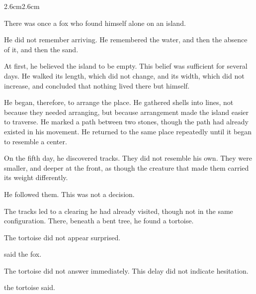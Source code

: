 \begin{adjustwidth}{2.6cm}{2.6cm}

There was once a fox who found himself alone on an island.

\medskip

He did not remember arriving. He remembered the water, and then the absence of
it, and then the sand.

\vspace{2em}

At first, he believed the island to be empty. This belief was sufficient for several
days. He walked its length, which did not change, and its width, which did not
increase, and concluded that nothing lived there but himself.

\vspace{2em}

He began, therefore, to arrange the place. He gathered shells into lines, not because
they needed arranging, but because arrangement made the island easier to traverse.
He marked a path between two stones, though the path had already existed in his
movement. He returned to the same place repeatedly until it began to resemble a
center.

\vspace{2em}

On the fifth day, he discovered tracks. They did not resemble his own. They were
smaller, and deeper at the front, as though the creature that made them carried its
weight differently.

\vspace{2em}

He followed them. This was not a decision.

\vspace{2em}

The tracks led to a clearing he had already visited, though not in the same
configuration. There, beneath a bent tree, he found a tortoise.

The tortoise did not appear surprised.

\vspace{2em}

 said the fox.

\medskip

The tortoise did not answer immediately. This delay did not indicate hesitation.

\vspace{2em}

 the tortoise said.


\end{adjustwidth}
